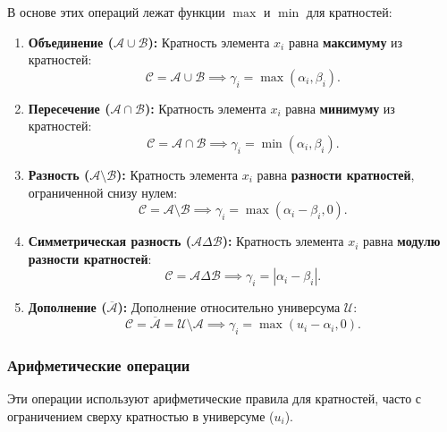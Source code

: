 В основе этих операций лежат функции $\max$ и $\min$ для кратностей:
\begin{enumerate}
    \item \textbf{Объединение ($\mathcal{A} \cup \mathcal{B}$):} Кратность элемента $x_i$ равна \textbf{максимуму} из кратностей:
    $$\mathcal{C} = \mathcal{A} \cup \mathcal{B} \implies \gamma_i = \max(\alpha_i, \beta_i).$$

    \item \textbf{Пересечение ($\mathcal{A} \cap \mathcal{B}$):} Кратность элемента $x_i$ равна \textbf{минимуму} из кратностей:
    $$\mathcal{C} = \mathcal{A} \cap \mathcal{B} \implies \gamma_i = \min(\alpha_i, \beta_i).$$

    \item \textbf{Разность ($\mathcal{A} \setminus \mathcal{B}$):} Кратность элемента $x_i$ равна \textbf{разности кратностей}, ограниченной снизу нулем:
    $$\mathcal{C} = \mathcal{A} \setminus \mathcal{B} \implies \gamma_i = \max(\alpha_i - \beta_i, 0).$$

    \item \textbf{Симметрическая разность ($\mathcal{A} \Delta \mathcal{B}$):} Кратность элемента $x_i$ равна \textbf{модулю разности кратностей}:
    $$\mathcal{C} = \mathcal{A} \Delta \mathcal{B} \implies \gamma_i = |\alpha_i - \beta_i|.$$

    \item \textbf{Дополнение ($\overline{\mathcal{A}}$):} Дополнение относительно универсума $\mathcal{U}$:
    $$\mathcal{C} = \overline{\mathcal{A}} = \mathcal{U} \setminus \mathcal{A} \implies \gamma_i = \max(u_i - \alpha_i, 0).$$
\end{enumerate}

\subsubsection*{Арифметические операции}

Эти операции используют арифметические правила для кратностей, часто с ограничением сверху кратностью в универсуме ($u_i$).

